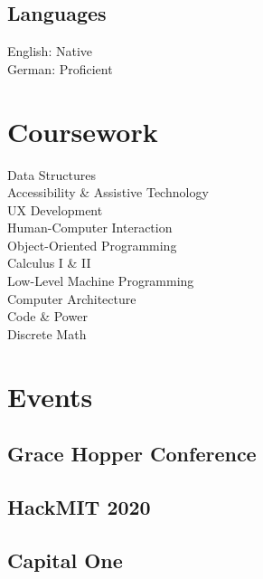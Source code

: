 \documentclass[]{hieudo-build}
\begin{document}
\begin{minipage}[t]{0.34\textwidth}
\subsection{Languages}
English: Native \\
German: Proficient \\
\sectionsep

\section{Coursework}
Data Structures \\
Accessibility \& Assistive Technology \\
UX Development \\
Human-Computer Interaction \\
Object-Oriented Programming \\
Calculus I \& II \\
Low-Level Machine Programming \\
Computer Architecture \\
Code \& Power \\
Discrete Math
\sectionsep

\section{Events}
\subsection{Grace Hopper Conference}
\smallsectionsep
\subsection{HackMIT 2020}
\smallsectionsep
\subsection{Capital One} 
\sectionsep



\end{minipage}
\end{document}
